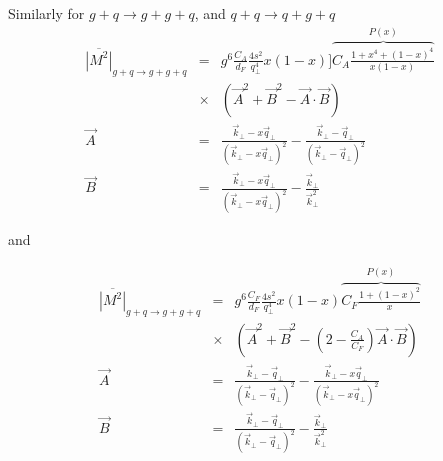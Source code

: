 Similarly for $g+q\rightarrow g+g+q$, and $q+q\rightarrow q+g+q$
\begin{eqnarray}
\overline{|M^2|}_{g+q\rightarrow g+g+q} &=& g^6 \frac{C_A}{d_F}\frac{4s^2}{q_\perp^4}x(1-x) ]\overbrace{C_A\frac{1+x^4+(1-x)^4}{x(1-x)}}^{P(x)}   \\\nonumber
&\times&\left(\vec{A}^2 + \vec{B}^2 - \vec{A}\cdot\vec{B}\right)\\
\vec{A} &=& \frac{\vec{k}_\perp - x\vec{q}_\perp}{(\vec{k}_\perp - x\vec{q}_\perp)^2} -  \frac{\vec{k}_\perp - \vec{q}_\perp}{(\vec{k}_\perp - \vec{q}_\perp)^2} \\
\vec{B} &=& \frac{\vec{k}_\perp - x\vec{q}_\perp}{(\vec{k}_\perp - x\vec{q}_\perp)^2} -  \frac{\vec{k}_\perp}{\vec{k}_\perp^2}
\end{eqnarray}

and

\begin{eqnarray}
\overline{|M^2|}_{g+q\rightarrow g+g+q} &=& g^6 \frac{C_F}{d_F}\frac{4s^2}{q_\perp^4}x(1-x) \overbrace{C_F\frac{1+(1-x)^2}{x}}^{P(x)}  \\\nonumber
&\times&\left(\vec{A}^2 + \vec{B}^2 - \left(2-\frac{C_A}{C_F}\right)\vec{A}\cdot\vec{B}\right)\\
\vec{A} &=& \frac{\vec{k}_\perp - \vec{q}_\perp}{(\vec{k}_\perp - \vec{q}_\perp)^2} -  \frac{\vec{k}_\perp - x\vec{q}_\perp}{(\vec{k}_\perp - x\vec{q}_\perp)^2} \\
\vec{B} &=& \frac{\vec{k}_\perp - \vec{q}_\perp}{(\vec{k}_\perp - \vec{q}_\perp)^2} -  \frac{\vec{k}_\perp}{\vec{k}_\perp^2}
\end{eqnarray}
